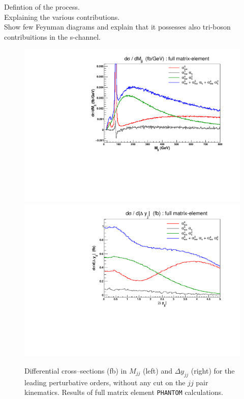 Defintion of the process. \\
Explaining the various contributions. \\
Show few Feynman diagrams and explain that it possesses also tri-boson contribuitions in the s-channel. \\


\begin{figure}[hbt]
\centering
\includegraphics[scale=0.395]{figures/scanfigures/mjj_full.pdf}
\includegraphics[scale=0.395]{figures/scanfigures/dyjj_full.pdf}
\caption{Differential cross--sections (fb) in $M_{jj}$ (left) and $\Delta y_{jj}$ (right) for the leading perturbative orders, without any cut on the $jj$ pair kinematics. Results of full matrix element \texttt{PHANTOM} calculations.} \label{fig:mjjdyjj_1d}
\end{figure}

